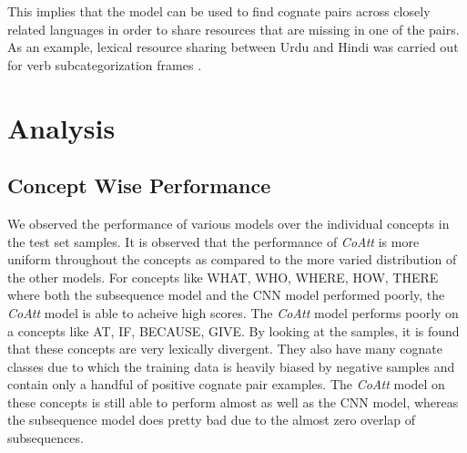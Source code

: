 \documentclass[11pt,letterpaper]{article}
\begin{document}
This implies that the model can be used to find cognate pairs across closely related languages in order to share resources that are missing in one of the pairs. As an example, lexical resource sharing between Urdu and Hindi was carried out for verb subcategorization frames \cite{bhat-EtAl:2014:LT4CloseLang}.

\section{Analysis}


\subsection{Concept Wise Performance}

We observed the performance of various models over the individual concepts in the test set samples. It is observed that the performance of \textit{CoAtt} is more uniform throughout the concepts as compared to the more varied distribution of the other models. For concepts like WHAT, WHO, WHERE, HOW, THERE where both the subsequence model and the CNN model performed poorly, the \textit{CoAtt} model is able to acheive high scores. The \textit{CoAtt} model performs poorly on a concepts like AT, IF, BECAUSE, GIVE. By looking at the samples, it is found that these concepts are very lexically divergent. They also have many cognate classes due to which the training data is heavily biased by negative samples and contain only a handful of positive cognate pair examples. The \textit{CoAtt} model on these concepts is still able to perform almost as well as the CNN model, whereas the subsequence model does pretty bad due to the almost zero overlap of subsequences.
\end{document}
